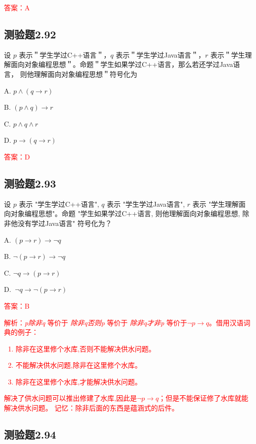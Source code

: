 \documentclass[UTF8, heading=true]{ctexart}
\begin{document}
\textcolor{red}{答案：A}  

\subsection{测验题2.92}

设 $p$ 表示＂学生学过C++语言＂，$q$ 表示＂学生学过Java语言＂，$r$ 
表示＂学生理解面向对象编程思想＂。命题＂学生如果学过C++语言，那么若还学过Java语言，
则他理解面向对象编程思想＂符号化为 $\qquad$

A. $
p \wedge(q \rightarrow r)
$


B. $
(p \wedge q) \rightarrow r
$


C. $
p \wedge q \wedge r
$


D. $
p \rightarrow(q \rightarrow r)
$

\textcolor{red}{答案：D}


\subsection{测验题2.93}

设 $p$ 表示 "学生学过C++语言", $q$ 表示 "学生学过Java语言", 
$r$ 表示 "学生理解面向对象编程思想"。命题 "学生如果学过C++语言, 
则他理解面向对象编程思想, 除非他没有学过Java语言" 符号化为？

A. $(p \rightarrow r) \rightarrow \neg q$

B. $\neg(p \rightarrow r) \rightarrow \neg q$

C. $\neg q \rightarrow(p \rightarrow r)$

D. $\ \neg q \rightarrow \neg(p \rightarrow r)$

\textcolor{red}{答案：B}

\textcolor{red}{解析：\textit{p除非q} 等价于 \textit{除非q否则p} 等价于 \textit{除非q才非p} 
等价于$\neg p\rightarrow q$。借用汉语词典的例子：
\begin{enumerate}
  \item \textcolor{red}{除非在这里修个水库,否则不能解决供水问题。}
  \item \textcolor{red}{不能解决供水问题,除非在这里修个水库。}
  \item \textcolor{red}{除非在这里修个水库,才能解决供水问题。}
\end{enumerate}
解决了供水问题可以推出修建了水库,因此是$\neg p\rightarrow q$；但是不能保证修了水库就能解决供水问题。
记忆：除非后面的东西是蕴涵式的后件。
}

\subsection{测验题2.94}
\end{document}
